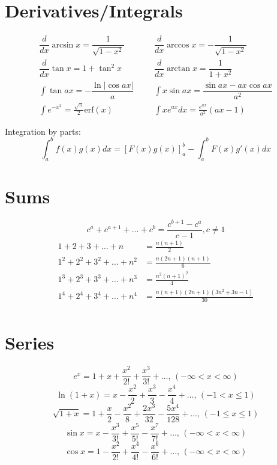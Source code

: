 \section{Derivatives/Integrals}
\begin{align*}
	\dfrac{d}{dx}\arcsin x = \dfrac{1}{\sqrt{1-x^2}} &&& \dfrac{d}{dx}\arccos x = -\dfrac{1}{\sqrt{1-x^2}} \\
	\dfrac{d}{dx}\tan x = 1+\tan^2 x &&& \dfrac{d}{dx}\arctan x = \dfrac{1}{1+x^2} \\
	\int\tan ax = -\dfrac{\ln|\cos ax|}{a} &&& \int x\sin ax = \dfrac{\sin ax-ax \cos ax}{a^2} \\
	\int e^{-x^2} = \frac{\sqrt \pi}{2} \text{erf}(x) &&& \int xe^{ax}dx = \frac{e^{ax}}{a^2}(ax-1)
\end{align*}

Integration by parts:
\[\int_a^bf(x)g(x)dx = [F(x)g(x)]_a^b-\int_a^bF(x)g'(x)dx\]

\section{Sums}
\[ c^a + c^{a+1} + \dots + c^{b} = \frac{c^{b+1} - c^a}{c-1}, c \neq 1 \]
\begin{align*}
	1 + 2 + 3 + \dots + n &= \frac{n(n+1)}{2} \\
	1^2 + 2^2 + 3^2 + \dots + n^2 &= \frac{n(2n+1)(n+1)}{6} \\
	1^3 + 2^3 + 3^3 + \dots + n^3 &= \frac{n^2(n+1)^2}{4} \\
	1^4 + 2^4 + 3^4 + \dots + n^4 &= \frac{n(n+1)(2n+1)(3n^2 + 3n - 1)}{30} \\
\end{align*}

\section{Series}
$$e^x = 1+x+\frac{x^2}{2!}+\frac{x^3}{3!}+\dots,\,(-\infty<x<\infty)$$
$$\ln(1+x) = x-\frac{x^2}{2}+\frac{x^3}{3}-\frac{x^4}{4}+\dots,\,(-1<x\leq1)$$
$$\sqrt{1+x} = 1+\frac{x}{2}-\frac{x^2}{8}+\frac{2x^3}{32}-\frac{5x^4}{128}+\dots,\,(-1\leq x\leq1)$$
$$\sin x = x-\frac{x^3}{3!}+\frac{x^5}{5!}-\frac{x^7}{7!}+\dots,\,(-\infty<x<\infty)$$
$$\cos x = 1-\frac{x^2}{2!}+\frac{x^4}{4!}-\frac{x^6}{6!}+\dots,\,(-\infty<x<\infty)$$
